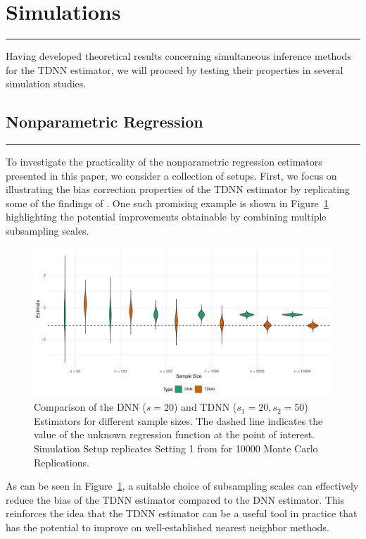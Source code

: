 \section{Simulations}\label{sec:simulations}
\hrule

Having developed theoretical results concerning simultaneous inference methods for the TDNN estimator, we will proceed by testing their properties in several simulation studies.

\subsection{Nonparametric Regression}
\hrule
To investigate the practicality of the nonparametric regression estimators presented in this paper, we consider a collection of setups.
First, we focus on illustrating the bias correction properties of the TDNN estimator by replicating some of the findings of \citet{demirkaya_optimal_2024}.
One such promising example is shown in Figure~\ref{fig:TDNN_bias_cor} highlighting the potential improvements obtainable by combining multiple subsampling scales.
\begin{figure}[H]
	\centering
	\includegraphics[width = \textwidth]{../Code/Simulations/Graphics/TDNN_DNN.pdf}
	\caption{Comparison of the DNN ($s = 20$) and TDNN ($s_1 = 20, s_2 = 50$) Estimators for different sample sizes.
		The dashed line indicates the value of the unknown regression function at the point of interest.
		Simulation Setup replicates Setting 1 from \citet{demirkaya_optimal_2024} for 10000 Monte Carlo Replications.}
	\label{fig:TDNN_bias_cor}
\end{figure}
As can be seen in Figure~\ref{fig:TDNN_bias_cor}, a suitable choice of subsampling scales can effectively reduce the bias of the TDNN estimator compared to the DNN estimator.
This reinforces the idea that the TDNN estimator can be a useful tool in practice that has the potential to improve on well-established nearest neighbor methods.

